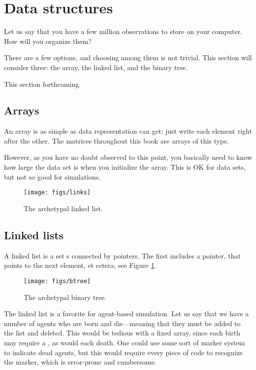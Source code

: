 \section{Data structures} Let us say that you have a few million
observations to store on your computer. How will you organize them?

There are a few options, and choosing among them is not trivial. This
section will consider three: the array, the linked list, and the binary
tree.

This section forthcoming.

\subsection{Arrays} An array is as simple as data representation can
get: just write each element right after the other. The matrices
throughout this book are arrays of this type.

However, as you have no doubt observed to this point, you basically need
to know how large the data set is when you initialize the array. This is
OK for data sets, but not so good for simulations.

\begin{figure}[htb]
\begin{center}
\texttt{[image: figs/links]}
\end{center}
\caption{The archetypal linked list.}
\label{listfig}
\end{figure}

\subsection{Linked lists} A linked list is a set s connected
by pointers. The first  includes a  pointer, that
points to the next element, et cetera; see Figure \ref{listfig}.

\begin{figure}[htb]
\begin{center}
\texttt{[image: figs/btree]}
\end{center}
\caption{The archetypal binary tree.}
\label{btreefig}
\end{figure}

The linked list is a favorite for agent-based simulation. Let us say
that we have a number of agents who are born and die---meaning that they
must be added to the list and deleted. This would be tedious with a
fixed array, since each birth may require a , as would each
death. One could use some sort of marker system to indicate dead agents,
but this would require every piece of code to recognize the marker,
which is error-prone and cumbersome.

